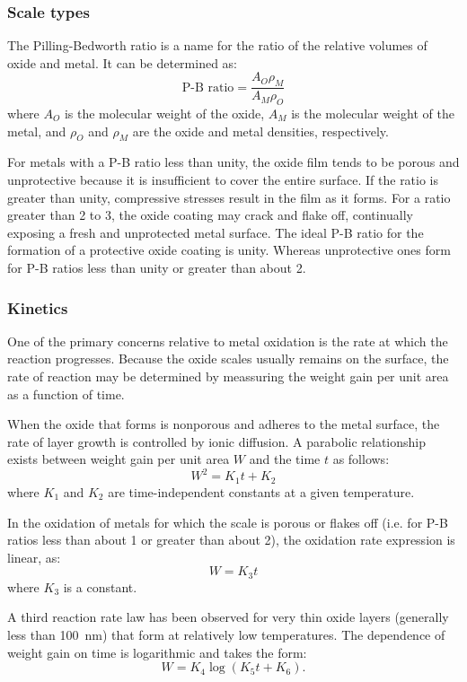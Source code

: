 \subsubsection{Scale types}
The Pilling-Bedworth ratio is a name for the ratio of the relative volumes of oxide and metal. It can be determined as:
\[ 
\text{P-B ratio} = \frac{A_{O} \rho_M}{A_M \rho_O}
\]
where $A_O$ is the molecular weight of the oxide, $A_M$ is the molecular weight of the metal, and $\rho_O$ and $\rho_M$ are the oxide and metal densities, respectively. 

For metals with a P-B ratio less than unity, the oxide film tends to be porous and unprotective because it is insufficient to cover the entire surface. If the ratio is greater than unity, compressive stresses result in the film as it forms. For a ratio greater than 2 to 3, the oxide coating may crack and flake off, continually exposing a fresh and unprotected metal surface. The ideal P-B ratio for the formation of a protective oxide coating is unity. Whereas unprotective ones form for P-B ratios less than unity or greater than about 2. 


\subsubsection{Kinetics}
One of the primary concerns relative to metal oxidation is the rate at which the reaction progresses. Because the oxide scales usually remains on the surface, the rate of reaction may be determined by meassuring the weight gain per unit area as a function of time.

When the oxide that forms is nonporous and adheres to the metal surface, the rate of layer growth is controlled by ionic diffusion. A parabolic relationship exists between weight gain per unit area $W$ and the time $t$ as follows:
\[ 
W^2 = K_1 t + K_2
\]
where $K_1$ and $K_2$ are time-independent constants at a given temperature.

In the oxidation of metals for which the scale is porous or flakes off (i.e. for P-B ratios less than about 1 or greater than about 2), the oxidation rate expression is linear, as:
\[ 
W = K_3 t
\]
where $K_3$ is a constant.

A third reaction rate law has been observed for very thin oxide layers (generally less than \qty{100}{nm}) that form at relatively low temperatures. The dependence of weight gain on time is logarithmic and takes the form:
\[ 
W = K_4 \log \left( K_5 t + K_6 \right)
.\]

